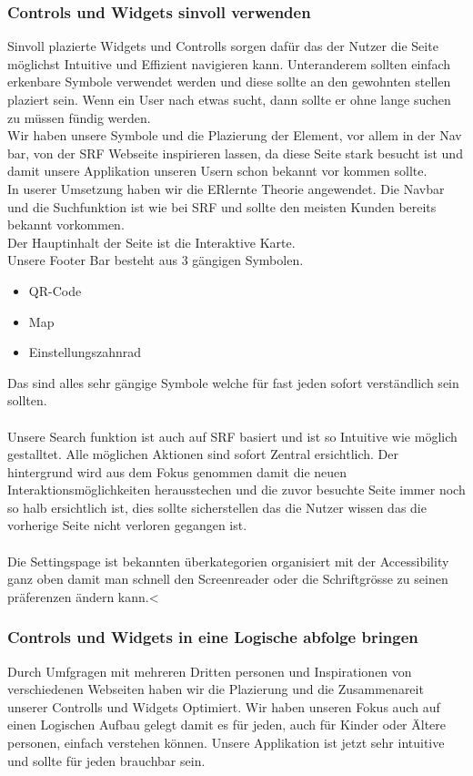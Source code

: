 \documentclass[10pt]{article}
\newcounter{subsubsubsection}[subsubsection]
\begin{document}
	\subsubsection{Controls und Widgets sinvoll verwenden}
	Sinvoll plazierte Widgets und Controlls sorgen dafür das der Nutzer die Seite möglichst Intuitive und Effizient navigieren kann. Unteranderem sollten einfach erkenbare Symbole verwendet werden und diese sollte an den gewohnten stellen plaziert sein. Wenn ein User nach etwas sucht, dann sollte er ohne lange suchen zu müssen fündig werden.\\
	Wir haben unsere Symbole und die Plazierung der Element, vor allem in der Nav bar, von der SRF Webseite inspirieren lassen, da diese Seite stark besucht ist und damit unsere Applikation unseren Usern schon bekannt vor kommen sollte.
	\\
	In userer Umsetzung haben wir die ERlernte Theorie angewendet. Die Navbar und die Suchfunktion ist wie bei SRF und sollte den meisten Kunden bereits bekannt vorkommen.
	\\
	Der Hauptinhalt der Seite ist die Interaktive Karte.
	\\
	Unsere Footer Bar besteht aus 3 gängigen Symbolen.
	\begin{itemize}
		\item QR-Code
		\item Map
		\item Einstellungszahnrad
	\end{itemize}
	Das sind alles sehr gängige Symbole welche für fast jeden sofort verständlich sein sollten.\\\\
	Unsere Search funktion ist auch auf SRF basiert und ist so Intuitive wie möglich gestalltet. Alle möglichen Aktionen sind sofort Zentral ersichtlich. Der hintergrund wird aus dem Fokus genommen damit die neuen Interaktionsmöglichkeiten herausstechen und die zuvor besuchte Seite immer noch so halb ersichtlich ist, dies sollte sicherstellen das die Nutzer wissen das die vorherige Seite nicht verloren gegangen ist.\\\\
	Die Settingspage ist bekannten überkategorien organisiert mit der Accessibility ganz oben damit man schnell den Screenreader oder die Schriftgrösse zu seinen präferenzen ändern kann.<
	\\
	\subsubsection{Controls und Widgets in eine Logische abfolge bringen}
	Durch Umfgragen mit mehreren Dritten personen und Inspirationen von verschiedenen Webseiten haben wir die Plazierung und die Zusammenareit unserer Controlls und Widgets Optimiert. Wir haben unseren Fokus auch auf einen Logischen Aufbau gelegt damit es für jeden, auch für Kinder oder Ältere personen, einfach verstehen können. Unsere Applikation ist jetzt sehr intuitive und sollte für jeden brauchbar sein.
	\\
	
\end{document}
